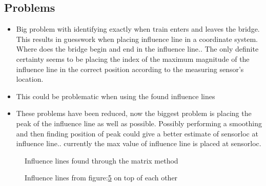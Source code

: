 \subsection{Problems}
\begin{itemize}
\item Big problem with identifying exactly when train enters and leaves the bridge. This results in guesswork when placing influence line in a coordinate system. Where does the bridge begin and end in the influence line.. The only definite certainty seems to be placing the index of the maximum magnitude of the influence line in the correct position according to the measuring sensor's location.
\item This could be problematic when using the found influence lines 
\item These problems have been reduced, now the biggest problem is placing the peak of the influence line as well as possible. Possibly performing a smoothing and then finding position of peak could give a better estimate of sensorloc at influence line.. currently the max value of influence line is placed at sensorloc.
\end{itemize}
\begin{figure}[H]
\centering
\begin{subfigure}[t]{0.45\textwidth}
	\centering
	
	\label{fig:train3}
\end{subfigure}
\qquad
\begin{subfigure}[t]{0.45\textwidth}
	\centering
		
	\label{fig:train4}
\end{subfigure}

\begin{subfigure}[t]{0.45\textwidth}
	\centering
	
	\label{fig:train5}
\end{subfigure}
\qquad
\begin{subfigure}[t]{0.45\textwidth}
	\centering
		
	\label{fig:train8}
\end{subfigure}
\caption{Influence lines found through the matrix method}\label{fig:infl_trains}
\end{figure}

\begin{figure}[H]
\centering

\caption{Influence lines from figure:\ref{fig:infl_trains} on top of each other}\label{fig:infl_all_trains}
\end{figure}
